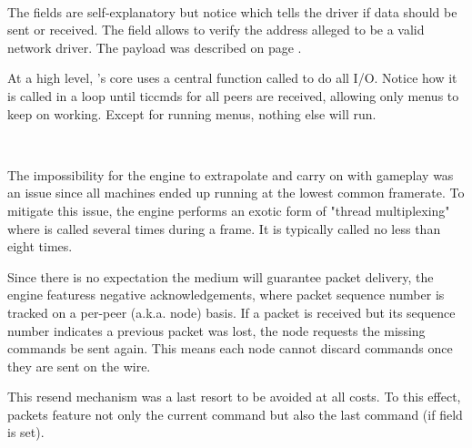  \label{doomcom_t.c} \\
\par
\vspace{-10pt}
The fields are self-explanatory but notice  which tells the driver if data should be sent or received. The  field allows \doom{} to verify the address alleged to be a valid network driver. The  payload was described on page \pageref{cmd_t_type}.



At a high level, \doom{}'s core uses a central function called  to do all I/O. Notice how it is called in a loop until ticcmds for all peers are received, allowing only menus to keep on working. Except for running menus, nothing else will run.\\
\par
{}\\
\par
The impossibility for the engine to extrapolate and carry on with gameplay was an issue since all machines ended up running at the lowest common framerate. To mitigate this issue, the engine performs an exotic form of "thread multiplexing" where  is called several times during a frame. It is typically called no less than eight times.\\
\par
{}



Since there is no expectation the medium will guarantee packet delivery, the engine featuress negative acknowledgements, where packet sequence number is tracked on a per-peer (a.k.a. node) basis. If a packet is received but its sequence number indicates a previous packet was lost, the node requests the missing commands be sent again. This means each node cannot discard commands once they are sent on the wire.\\
\par
This resend mechanism was a last resort to be avoided at all costs. To this effect, packets feature not only the current command but also the last command (if field  is set).\\




\vspace{-15pt}
